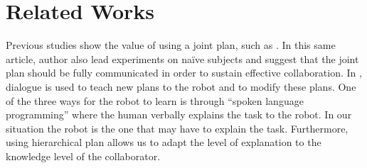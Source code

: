 \documentclass{llncs}
\begin{document}


\section{Related Works}





Previous studies show the value of using a joint plan, such as \cite{Lallee2013}. In this same article, author also lead experiments on na\"ive subjects and suggest that the joint plan should be fully communicated in order to sustain effective collaboration. In \cite{Petit2012}, dialogue is used to teach new plans to the robot and to modify these plans. One of the three ways for the robot to learn is through ``spoken language programming'' where the human verbally explains the task to the robot. In our situation the robot is the one that may have to explain the task. Furthermore, using hierarchical plan allows us to adapt the level of explanation to the knowledge level of the collaborator.


\end{document}
